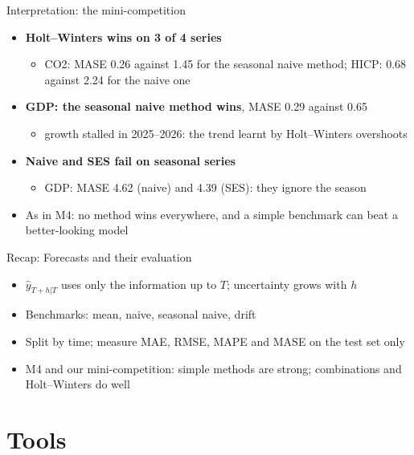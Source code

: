 \begin{frame}{Interpretation: the mini-competition}
\itemsize{\small}
\begin{itemize}
    \item \textbf{Holt--Winters wins on 3 of 4 series}
    \begin{itemize}
        \item CO2: MASE 0.26 against 1.45 for the seasonal naive method; HICP: 0.68 against 2.24 for the naive one
    \end{itemize}
    \item \textbf{GDP: the seasonal naive method wins}, MASE 0.29 against 0.65
    \begin{itemize}
        \item growth stalled in 2025--2026: the trend learnt by Holt--Winters overshoots
    \end{itemize}
    \item \textbf{Naive and SES fail on seasonal series}
    \begin{itemize}
        \item GDP: MASE 4.62 (naive) and 4.39 (SES): they ignore the season
    \end{itemize}
    \item As in M4: no method wins everywhere, and a simple benchmark can beat a better-looking model
\end{itemize}
\end{frame}

\begin{frame}{Recap: Forecasts and their evaluation}
\itemsize{\small}
\begin{itemize}
    \item $\hat y_{T+h|T}$ uses only the information up to $T$; uncertainty grows with $h$
    \item Benchmarks: mean, naive, seasonal naive, drift
    \item Split by time; measure MAE, RMSE, MAPE and MASE on the test set only
    \item M4 and our mini-competition: simple methods are strong; combinations and Holt--Winters do well
\end{itemize}
\end{frame}


\section{Tools}

